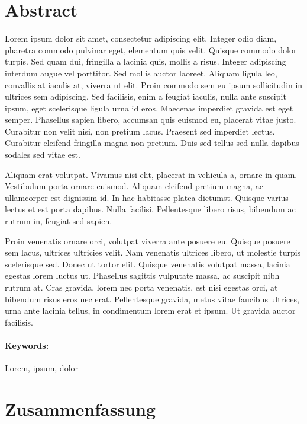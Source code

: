 \section*{Abstract}

Lorem ipsum dolor sit amet, consectetur adipiscing elit. Integer odio diam, pharetra commodo pulvinar eget, elementum quis velit. Quisque commodo dolor turpis. Sed quam dui, fringilla a lacinia quis, mollis a risus. Integer adipiscing interdum augue vel porttitor. Sed mollis auctor laoreet. Aliquam ligula leo, convallis at iaculis at, viverra ut elit. Proin commodo sem eu ipsum sollicitudin in ultrices sem adipiscing. Sed facilisis, enim a feugiat iaculis, nulla ante suscipit ipsum, eget scelerisque ligula urna id eros. Maecenas imperdiet gravida est eget semper. Phasellus sapien libero, accumsan quis euismod eu, placerat vitae justo. Curabitur non velit nisi, non pretium lacus. Praesent sed imperdiet lectus. Curabitur eleifend fringilla magna non pretium. Duis sed tellus sed nulla dapibus sodales sed vitae est.

Aliquam erat volutpat. Vivamus nisi elit, placerat in vehicula a, ornare in quam. Vestibulum porta ornare euismod. Aliquam eleifend pretium magna, ac ullamcorper est dignissim id. In hac habitasse platea dictumst. Quisque varius lectus et est porta dapibus. Nulla facilisi. Pellentesque libero risus, bibendum ac rutrum in, feugiat sed sapien.

Proin venenatis ornare orci, volutpat viverra ante posuere eu. Quisque posuere sem lacus, ultrices ultricies velit. Nam venenatis ultrices libero, ut molestie turpis scelerisque sed. Donec ut tortor elit. Quisque venenatis volutpat massa, lacinia egestas lorem luctus ut. Phasellus sagittis vulputate massa, ac suscipit nibh rutrum at. Cras gravida, lorem nec porta venenatis, est nisi egestas orci, at bibendum risus eros nec erat. Pellentesque gravida, metus vitae faucibus ultrices, urna ante lacinia tellus, in condimentum lorem erat et ipsum. Ut gravida auctor facilisis.

\paragraph{Keywords:} Lorem, ipsum, dolor

\newpage
\section*{Zusammenfassung}


